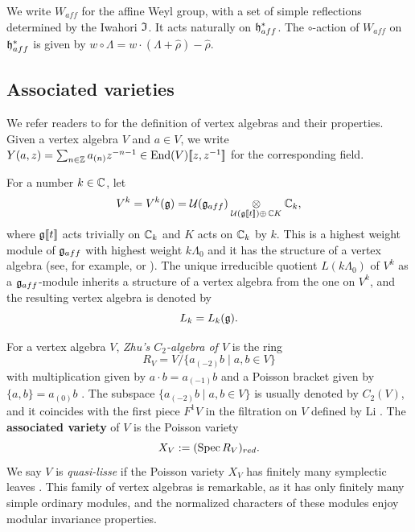 \documentclass[reqno]{amsart}
\newcommand{\series}[1]{[\![{\ensuremath{#1}}]\!]}
\begin{document}
We write $W_{aff}$ for the affine Weyl group, with a set of simple reflections determined by the Iwahori $\mathfrak{I}$. It acts naturally on $\mathfrak{h}_{aff}^*$. The $\circ$-action of $W_{aff}$ on $\mathfrak{h}_{aff}^*$ is given by $w \circ \Lambda = w\cdot(\Lambda+\hat \rho) - \hat \rho$. 



\subsection{Associated varieties}

We refer readers to \cite{Kac:VA, Frenkel-Ben-Zvi, Arakawa:W-alg-notes} for the definition of vertex algebras and their properties. Given a vertex algebra $V$ and $a \in V$, we write $Y(a,z) = \sum_{n \in \BZ} a_{(n)} z^{-n-1} \in \End(V) \series{z,z\inv}$ for the corresponding field.

For a number $k \in \mathbb{C}$, let
\begin{equation*}
	V^k = V^k(\fg) = \cU(\fg_{aff}) \dotimes_{\cU(\fg\series{t}) \oplus \,\BC K} \BC_k,
\end{equation*}
where $\fg\series{t}$ acts trivially on $\mathbb{C}_k$ and $K$ acts on $\mathbb{C}_k$ by $k$. This is a highest weight module of $\mathfrak{g}_{aff}$ with highest weight $k \Lambda_0$ and it has the structure of a vertex algebra (see, for example, \cite{Frenkel-Zhu} or \cite[]{Frenkel-Ben-Zvi}). 
The unique irreducible quotient $L(k \Lambda_0)$ of $V^k$ as a $\mathfrak{g}_{aff}$-module inherits a structure of a vertex algebra from the one on $V^k$, and the resulting vertex algebra is denoted by
\begin{equation*}
	L_k = L_k(\mathfrak{g}).
\end{equation*}

For a vertex algebra $V$, \textit{Zhu's $C_2$-algebra of $V$} is the ring
\begin{equation*}
	R_V = V/ \{a_{(-2)} b \mid a,b \in V\}
\end{equation*}
with multiplication given by $a \cdot b = a_{(-1)} b$ and a Poisson bracket given by $\{a,b\} = a_{(0)}b$ \cite{Zhu:thesis}. The subspace $\{a_{(-2)} b \mid a,b \in V\}$ is usually denoted by $C_2(V)$, and it coincides with the first piece $F^1 V$ in the filtration on $V$ defined by Li \cite{Li:abVA}. The \textbf{associated variety} of $V$ is the Poisson variety
\begin{equation*}
	X_V := (\operatorname{Spec} R_V )_{red}.
\end{equation*}
We say $V$ is \textit{quasi-lisse} if the Poisson variety $X_V$ has finitely many symplectic leaves \cite{Arakawa-Kawasetsu}. This family of vertex algebras is remarkable, as it has only finitely many simple ordinary modules, and the normalized characters of these modules enjoy modular invariance properties.
\end{document}
